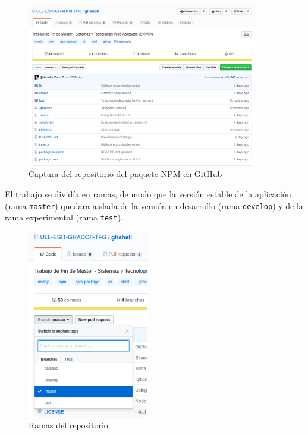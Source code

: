 \begin{figure}[H]
\begin{center}
\includegraphics[width=0.9\textwidth]{images/github1}
\caption{Captura del repositorio del paquete NPM en GitHub}
\label{fig:github1}
\end{center}
\end{figure}

El trabajo se dividía en ramas, de modo que la versión estable de la aplicación (rama \verb|master|) quedara aislada de la 
versión en desarrollo (rama \verb|develop|) y de la rama experimental (rama \verb|test|).


\begin{figure}[H]
\begin{center}
\includegraphics[width=0.47\textwidth]{images/github2}
\caption{Ramas del repositorio}
\label{fig:github2}
\end{center}
\end{figure}


